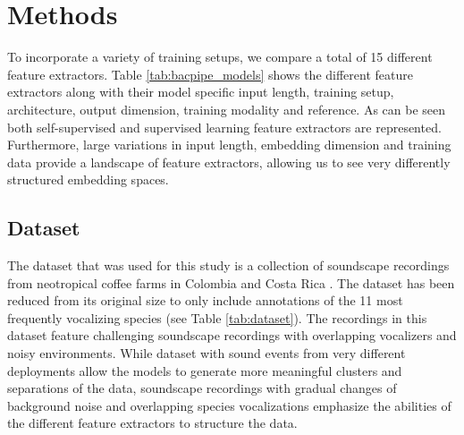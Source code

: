 \section{Methods}
\label{sec:methods}

To incorporate a variety of training setups, we compare a total of 15 different feature extractors.
Table \ref{tab:bacpipe_models} shows the different feature extractors along with their model specific input length, training setup, architecture, output dimension, training modality and reference. 
As can be seen both self-supervised and supervised learning feature extractors are represented. 
Furthermore, large variations in input length, embedding dimension and training data provide a landscape of feature extractors, allowing us to see very differently structured embedding spaces.

\subsection{Dataset}
\label{ssub:dataset}


The dataset that was used for this study is a collection of soundscape recordings from neotropical coffee farms in Colombia and Costa Rica \cite{vega-hidalgo_collection_2023}.
The dataset has been reduced from its original size to only include annotations of the 11 most frequently vocalizing species (see Table \ref{tab:dataset}).
The recordings in this dataset feature challenging soundscape recordings with overlapping vocalizers and noisy environments.
While dataset with sound events from very different deployments allow the models to generate more meaningful clusters and separations of the data, soundscape recordings with gradual changes of background noise and overlapping species vocalizations emphasize the abilities of the different feature extractors to structure the data.



